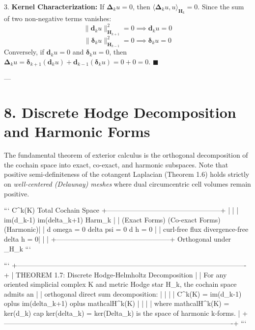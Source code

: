 \documentclass[11pt,twoside,openright]{amsbook}
\begin{document}
3. \textbf{Kernel Characterization:}  
   If $\boldsymbol{\Delta}_k u = 0$, then $\langle \boldsymbol{\Delta}_k u, u \rangle_{\mathbf{H}_k} = 0$. Since the sum of two non-negative terms vanishes:
   $$\| \mathbf{d}_k u \|_{\mathbf{H}_{k+1}}^2 = 0 \implies \mathbf{d}_k u = 0$$
   $$\| \boldsymbol{\delta}_k u \|_{\mathbf{H}_{k-1}}^2 = 0 \implies \boldsymbol{\delta}_k u = 0$$
   Conversely, if $\mathbf{d}_k u = 0$ and $\boldsymbol{\delta}_k u = 0$, then $\boldsymbol{\Delta}_k u = \boldsymbol{\delta}_{k+1}(\mathbf{d}_k u) + \mathbf{d}_{k-1}(\boldsymbol{\delta}_k u) = 0 + 0 = 0$. $\blacksquare$

---

\section{8. Discrete Hodge Decomposition and Harmonic Forms}

The fundamental theorem of exterior calculus is the orthogonal decomposition of the cochain space into exact, co-exact, and harmonic subspaces. Note that positive semi-definiteness of the cotangent Laplacian (Theorem 1.6) holds strictly on \textit{well-centered (Delaunay) meshes} where dual circumcentric cell volumes remain positive.

```
                  C^k(K) Total Cochain Space
     +--------------------------------------------------+
     |                                                  |
     |   im(d_{k-1})       im(delta_{k+1})     Harm_k   |
     |  (Exact Forms)     (Co-exact Forms)    (Harmonic)|
     |   d omega = 0       delta psi = 0      d h = 0   |
     |  curl-free flux     divergence-free   delta h = 0|
     |                                                  |
     +--------------------------------------------------+
               Orthogonal under _{H_k}
```

```
+----------------------------------------------------------------------------------------------------+
| THEOREM 1.7: Discrete Hodge-Helmholtz Decomposition                                                |
| For any oriented simplicial complex K and metric Hodge star H_k, the cochain space admits an        |
| orthogonal direct sum decomposition:                                                               |
|                                                                                                    |
|   C^k(K) = im(d_{k-1}) oplus im(delta_{k+1}) oplus mathcal{H}^k(K)                                 |
|                                                                                                    |
| where mathcal{H}^k(K) = ker(d_k) cap ker(delta_k) = ker(Delta_k) is the space of harmonic k-forms. |
+----------------------------------------------------------------------------------------------------+
```
\end{document}
